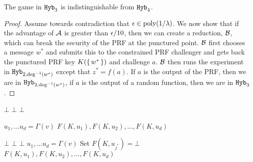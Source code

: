 \begin{lemma}
	\label{lemma:hybC}
	The game in $\texttt{Hyb}_{3}$ is indistinguishable from $\texttt{Hyb}_4$.
	\begin{proof}
		Assume towards contradiction that $\epsilon \in \operatorname{poly}(1/\lambda)$.
		We now show that if the advantage of $\mathcal{A}$ is greater than $\epsilon/10$, then we can
		create a reduction, $\mathcal{B}$, which can break the security of the PRF at the punctured point.
		$\mathcal{B}$ first chooses a message $w^*$ and submits this to the constrained PRF challenger and gets back the punctured PRF key
		$K(\set{w^*})$ and challenge $a$. $\mathcal{B}$ then runs the experiment in $\texttt{Hyb}_{2, \deg^{-1}(w^*)}$
		except that $z^* = f(a)$. If $a$ is the output of the PRF, then we are in $\texttt{Hyb}_{2, \deg^{-1}(w^*)}$,
		if $a$ is the output of a random function, then we are in $\texttt{Hyb}_3$.
	\end{proof}
\end{lemma}

\begin{algorithm}[H]
	\caption{
		Circuit for the neighbor function, $\circNeigb$ with PRF key
		$K$ and constant $w^*, z^*$%
	}
	\begin{algorithmic}[1]
				\State \Return $\bot$
			\EndIf
				\State \Return $\bot$ 
			\EndIf
				\State \Return $\bot$
			\EndIf
			
			\State $u_1, \dots u_d = \Gamma(v)$
			\State \Return $F(K, u_1), F(K, u_2), \dots, F(K, u_d)$
		\EndFunction
	\end{algorithmic}
	\label{alg:neighbHyb1}
\end{algorithm}


\begin{algorithm}[H]
	\caption{
		Circuit for the neighbor function, $\circNeigb$ with punctured PRF key
		$K(S)$ and constant $w^*, Y^*, J^*, z^*$%
	}
	\begin{algorithmic}[1]
				\State \Return $\bot$
			\EndIf
				\State \Return $\bot$ 
			\EndIf
				\State \Return $\bot$
			\EndIf
			\State $u_1, \dots u_d = \Gamma(v)$
			 	\State Set $F(K, u_{j^*}) = \bot$
			\EndWhile
			\State \Return $F(K, u_1), F(K, u_2), \dots, F(K, u_d)$
		\EndFunction
	\end{algorithmic}
	\label{alg:neighbHyb2}
\end{algorithm}